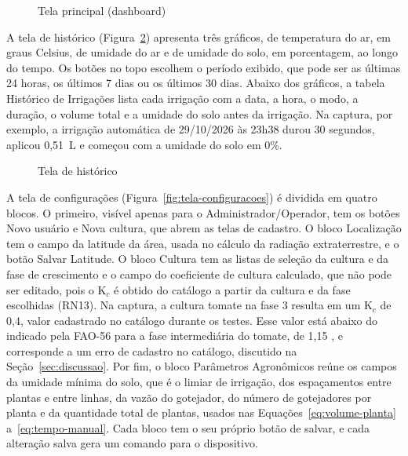 \begin{figure}[!htbp]
  \centering
  \caption{Tela principal (dashboard)}
  \label{fig:tela-dashboard}
\end{figure}

A tela de histórico (Figura~\ref{fig:tela-historico}) apresenta três gráficos, de temperatura do ar, em graus Celsius, de umidade do ar e de umidade do solo, em porcentagem, ao longo do tempo. Os botões no topo escolhem o período exibido, que pode ser as últimas 24 horas, os últimos 7 dias ou os últimos 30 dias. Abaixo dos gráficos, a tabela Histórico de Irrigações lista cada irrigação com a data, a hora, o modo, a duração, o volume total e a umidade do solo antes da irrigação. Na captura, por exemplo, a irrigação automática de 29/10/2026 às 23h38 durou 30 segundos, aplicou 0,51~L e começou com a umidade do solo em 0\%.

\begin{figure}[!htbp]
  \centering
  \caption{Tela de histórico}
  \label{fig:tela-historico}
\end{figure}

A tela de configurações (Figura~\ref{fig:tela-configuracoes}) é dividida em quatro blocos. O primeiro, visível apenas para o Administrador/Operador, tem os botões Novo usuário e Nova cultura, que abrem as telas de cadastro. O bloco Localização tem o campo da latitude da área, usada no cálculo da radiação extraterrestre, e o botão Salvar Latitude. O bloco Cultura tem as listas de seleção da cultura e da fase de crescimento e o campo do coeficiente de cultura calculado, que não pode ser editado, pois o K$_c$ é obtido do catálogo a partir da cultura e da fase escolhidas (RN13). Na captura, a cultura tomate na fase 3 resulta em um K$_c$ de 0,4, valor cadastrado no catálogo durante os testes. Esse valor está abaixo do indicado pela FAO-56 para a fase intermediária do tomate, de 1,15 \cite{allen1998}, e corresponde a um erro de cadastro no catálogo, discutido na Seção~\ref{sec:discussao}. Por fim, o bloco Parâmetros Agronômicos reúne os campos da umidade mínima do solo, que é o limiar de irrigação, dos espaçamentos entre plantas e entre linhas, da vazão do gotejador, do número de gotejadores por planta e da quantidade total de plantas, usados nas Equações~\ref{eq:volume-planta} a~\ref{eq:tempo-manual}. Cada bloco tem o seu próprio botão de salvar, e cada alteração salva gera um comando para o dispositivo.

